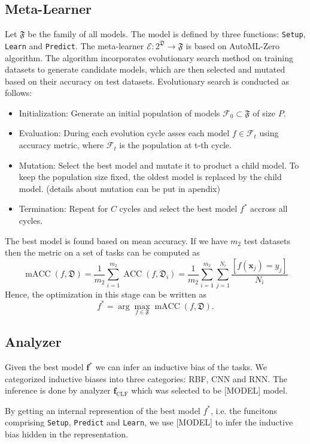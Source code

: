 \documentclass{article}
\begin{document}
\subsection{Meta-Learner}
Let \(\mathfrak{F}\) be the family of all models. The model is defined by three functions: \texttt{Setup}, \texttt{Learn} and \texttt{Predict}. The meta-learner \(\mathcal{E}: 2^{\mathfrak{D}} \rightarrow \mathfrak{F}\) is based on AutoML-Zero algorithm. The algorithm incorporates evolutionary search method on training datasets to generate candidate models, which are then selected and mutated based on their accuracy on test datasets. Evolutionary search is conducted as follows:
\begin{itemize}
    \item Initialization: Generate an initial population of models \( \mathcal{F}_0 \subset \mathfrak{F} \) of size \(P\).
    \item Evaluation: During each evolution cycle asses each model \( f \in \mathcal{F}_t \) using accuracy metric, where \(\mathcal{F}_t\) is the population at t-th cycle.
    \item Mutation: Select the best model and mutate it to product a child model. To keep the population size fixed, the oldest model is replaced by the child model. (details about mutation can be put in apendix)
    \item Termination: Repeat for \(C\) cycles and select the best model \( f^* \) accross all cycles.
\end{itemize}
The best model is found based on mean accuracy. If we have \(m_2\) test datasets then the metric on a set of tasks can be computed as 
\[
 \operatorname{mACC}(f, \mathfrak{D}) = \frac{1}{m_2} \sum_{i = 1}^{m_2} \operatorname{ACC}(f, \mathfrak{D}_i)
    = \frac{1}{m_2} \sum_{i=1}^{m_2} \sum_{j=1}^{N_i} \frac{[f(\mathbf{x}_j) = y_j]}{N_i}
\]
Hence, the optimization in this stage can be written as 
\[
    f^* = \arg \max_{f \in \mathfrak{F}} \operatorname{mACC}(f, \mathfrak{D}).
\]

\subsection{Analyzer}
Given the best model \(\mathbf{f}^*\) we can infer an inductive bias of the tasks. We categorized inductive biases into three categories: RBF, CNN and RNN. The inference is done by analyzer \(\mathbf{f}_{\text{CLF}}\) which was selected to be [MODEL] model. 

By getting an internal represention of the best model \(f^*\), i.e. the funcitons comprising \texttt{Setup}, \texttt{Predict} and \texttt{Learn}, we use [MODEL] to infer the inductive bias hidden in the representation. 
\end{document}
